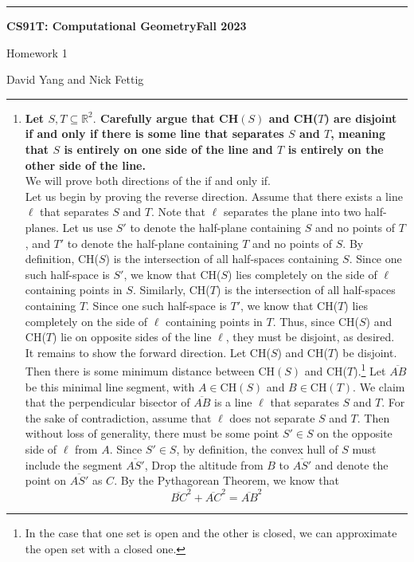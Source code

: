 \documentclass[11pt]{article}
\begin{document}
\hrule
\begin{center}
    \textbf{CS91T: Computational Geometry}\hfill \textbf{Fall 2023}\newline

    {\Large Homework 1}

    David Yang and Nick Fettig
\end{center}

\hrule

\vspace{1em}


\begin{enumerate}

    \item \textbf{Let $S, T \subseteq \mathbb{R}^2.$ Carefully argue that CH$(S)$ and CH($T$) are disjoint if and only if there is some line that separates $S$ and $T$, meaning that $S$ is entirely on one side of the line and $T$ is entirely on the other side of the line.} \\

    We will prove both directions of the if and only if. \\
    
    Let us begin by proving the reverse direction. Assume that there exists a line $\ell$ that separates $S$ and $T$. Note that $\ell$ separates the plane into two half-planes. Let us use $S'$ to denote the half-plane containing $S$ and no points of $T$, and $T'$ to denote the half-plane containing $T$ and no points of $S.$ By definition, CH($S$) is the intersection of all half-spaces containing $S$. Since one such half-space is $S'$, we know that CH($S$) lies completely on the side of $\ell$ containing points in $S$. Similarly, CH($T$) is the intersection of all half-spaces containing $T$. Since one such half-space is $T'$, we know that CH($T$) lies completely on the side of $\ell$ containing points in $T$. Thus, since CH($S$) and CH($T$) lie on opposite sides of the line $\ell$, they must be disjoint, as desired. \\

    It remains to show the forward direction. Let CH($S$) and CH($T$) be disjoint. Then there is some minimum distance between CH$(S)$ and CH($T$).\footnote{In the case that one set is open and the other is closed, we can approximate the open set with a closed one.} Let $\overline{AB}$ be this minimal line segment, with $A \in \text{CH}(S)$ and $B \in \text{CH}(T)$. We claim that the perpendicular bisector of $\overline{AB}$ is a line $\ell$ that separates $S$ and $T$. For the sake of contradiction, assume that $\ell$ does not separate $S$ and $T$. Then without loss of generality, there must be some point $S' \in S$ on the opposite side of $\ell$ from $A$. Since $S' \in S$, by definition, the convex hull of $S$ must include the segment $\overline{AS'}$, Drop the altitude from $B$ to $\overline{AS'}$ and denote the point on $\overline{AS'}$ as $C$. By the Pythagorean Theorem, we know that \[\overline{BC}^2 + \overline{AC}^2 = \overline{AB}^2\]


\end{enumerate}
\end{document}
